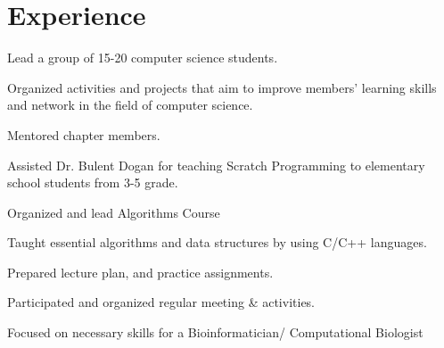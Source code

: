 \documentclass[]{deedy-resume-openfont}
\begin{document}
\hfill
\begin{minipage}[t]{0.66\textwidth} 
\iftrue



\section{Experience}

\vspace{\topsep} 
\begin{tightemize}
\item Lead a group of 15-20 computer science students.
\item Organized activities and projects that aim to improve members' learning skills and network in the field of computer science.
\item Mentored chapter members.
\end{tightemize}
\sectionsep

\begin{tightemize}
\item Assisted Dr. Bulent Dogan for teaching Scratch Programming to elementary school students from 3-5 grade.
\end{tightemize}
\sectionsep

\begin{tightemize}
\item Organized and lead Algorithms Course
\item Taught essential algorithms and data structures by using C/C++ languages.
\item Prepared lecture plan, and practice assignments.
\end{tightemize}
\sectionsep

\begin{tightemize}
\item Participated and organized regular meeting \& activities.
\item Focused on necessary skills for a Bioinformatician/ Computational Biologist
\end{tightemize}
\sectionsep


\end{minipage}
\end{document}

